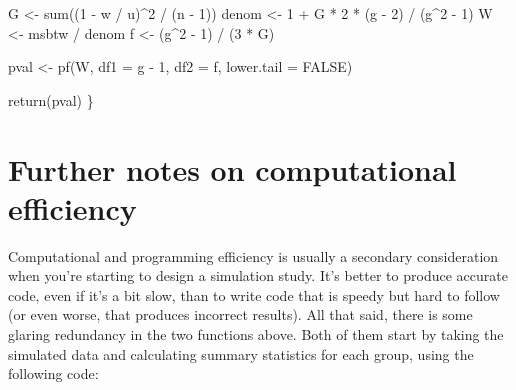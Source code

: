\documentclass[
]{book}
\newenvironment{Shaded}{\begin{snugshade}}{\end{snugshade}}
\newcommand{\AttributeTok}[1]{\textcolor[rgb]{0.77,0.63,0.00}{#1}}
\newcommand{\ConstantTok}[1]{\textcolor[rgb]{0.00,0.00,0.00}{#1}}
\newcommand{\DecValTok}[1]{\textcolor[rgb]{0.00,0.00,0.81}{#1}}
\newcommand{\FunctionTok}[1]{\textcolor[rgb]{0.00,0.00,0.00}{#1}}
\newcommand{\NormalTok}[1]{#1}
\newcommand{\OtherTok}[1]{\textcolor[rgb]{0.56,0.35,0.01}{#1}}
\newcommand{\SpecialCharTok}[1]{\textcolor[rgb]{0.00,0.00,0.00}{#1}}
\begin{document}
\begin{Shaded}
\begin{Highlighting}[]
\NormalTok{  G }\OtherTok{\textless{}{-}} \FunctionTok{sum}\NormalTok{((}\DecValTok{1} \SpecialCharTok{{-}}\NormalTok{ w }\SpecialCharTok{/}\NormalTok{ u)}\SpecialCharTok{\^{}}\DecValTok{2} \SpecialCharTok{/}\NormalTok{ (n }\SpecialCharTok{{-}} \DecValTok{1}\NormalTok{))}
\NormalTok{  denom }\OtherTok{\textless{}{-}} \DecValTok{1} \SpecialCharTok{+}\NormalTok{  G }\SpecialCharTok{*} \DecValTok{2} \SpecialCharTok{*}\NormalTok{ (g }\SpecialCharTok{{-}} \DecValTok{2}\NormalTok{) }\SpecialCharTok{/}\NormalTok{ (g}\SpecialCharTok{\^{}}\DecValTok{2} \SpecialCharTok{{-}} \DecValTok{1}\NormalTok{)}
\NormalTok{  W }\OtherTok{\textless{}{-}}\NormalTok{ msbtw }\SpecialCharTok{/}\NormalTok{ denom}
\NormalTok{  f }\OtherTok{\textless{}{-}}\NormalTok{ (g}\SpecialCharTok{\^{}}\DecValTok{2} \SpecialCharTok{{-}} \DecValTok{1}\NormalTok{) }\SpecialCharTok{/}\NormalTok{ (}\DecValTok{3} \SpecialCharTok{*}\NormalTok{ G)}

\NormalTok{  pval }\OtherTok{\textless{}{-}} \FunctionTok{pf}\NormalTok{(W, }\AttributeTok{df1 =}\NormalTok{ g }\SpecialCharTok{{-}} \DecValTok{1}\NormalTok{, }\AttributeTok{df2 =}\NormalTok{ f, }\AttributeTok{lower.tail =} \ConstantTok{FALSE}\NormalTok{)}

  \FunctionTok{return}\NormalTok{(pval)}
\NormalTok{\}}
\end{Highlighting}
\end{Shaded}

\hypertarget{further-notes-on-computational-efficiency}{%
\section{Further notes on computational efficiency}\label{further-notes-on-computational-efficiency}}

Computational and programming efficiency is usually a secondary consideration when you're starting to design a simulation study. It's better to produce accurate code, even if it's a bit slow, than to write code that is speedy but hard to follow (or even worse, that produces incorrect results). All that said, there is some glaring redundancy in the two functions above.
Both of them start by taking the simulated data and calculating summary statistics for each group, using the following code:

\begin{Shaded}
\end{Shaded}
\end{document}
